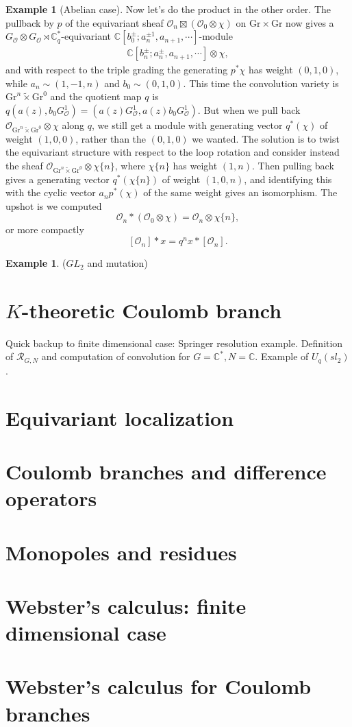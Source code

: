 \documentclass[11pt]{amsart}
\theoremstyle{definition}
\newtheorem{example}[dummy]{Example}
\newcommand{\bC}{\mathbb{C}}
\newcommand{\Gr}{\mathrm{Gr}}
\newcommand{\Oc}{\mathcal{O}}
\newcommand{\Rc}{{\mathcal{R}}}
\numberwithin{equation}{subsection}
\numberwithin{figure}{subsection}
\begin{document}
\begin{example}[Abelian case]
Now let's do the product in the other order. The pullback by $p$ of the equivariant sheaf $\Oc_{n}\boxtimes (\Oc_{0}\otimes \chi)$ on $\Gr\times \Gr$ now gives a 
$G_\Oc\otimes G_\Oc\rtimes\bC^*_q$-equivariant $\bC[b_0^\pm;a_n^{\pm1},a_{n+1},\cdots]$-module 
\begin{align}
\label{eq:big-module2}
\bC[b_n^\pm;a_n^{\pm},a_{n+1},\cdots]\otimes \chi,
\end{align}
and with respect to the triple grading the generating $p^*\chi$ has weight $(0,1,0)$, while $a_n\sim (1,-1,n)$ and $b_0\sim (0,1,0)$. This time the convolution variety is $\Gr^{n}\widetilde\times \Gr^{0} $
and the quotient map $q$ is $q(a(z),b_0G^1_\Oc) = (a(z)G^1_\Oc,a(z)b_0G^1_\Oc)$.
But when we pull back $\Oc_{\Gr^{n}\widetilde\times \Gr^{0}}\otimes \chi$ along $q$, we still get a module with generating vector $q^*(\chi)$ of weight $(1,0,0)$, rather than the $(0,1,0)$ we wanted. The solution is to twist the equivariant structure with respect to the loop rotation and consider instead the sheaf $\Oc_{\Gr^{n}\widetilde\times \Gr^{0}}\otimes \chi\{n\}$, where $\chi\{n\}$ has weight $(1,n)$. Then pulling back gives a generating vector $q^*(\chi\{n\})$ of weight  $(1,0,n)$, and identifying this with the cyclic vector $a_np^*(\chi)$ of the same weight gives an isomorphism. The upshot is we computed
$$
\Oc_n * (\Oc_{0}\otimes \chi) = \Oc_n\otimes\chi\{n\},
$$
or more compactly
$$
[\Oc_n]*x =  q^n x*[\Oc_n].
$$
\end{example}


\begin{example}{($GL_2$ and mutation)}

\end{example}



\section{$K$-theoretic Coulomb branch}
Quick backup to finite dimensional case: Springer resolution example. Definition of $\Rc_{G,N}$ and computation of convolution for $G=\bC^*,N=\bC$. Example of $U_q(sl_2)$.

\section{Equivariant localization}

\section{Coulomb branches and difference operators}

\section{Monopoles and residues}

\section{Webster's calculus: finite dimensional case}

\section{Webster's calculus for Coulomb branches}


 
\end{document}
